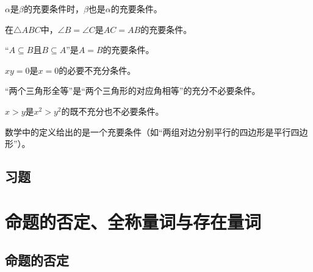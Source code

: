 \documentclass[lang=cn,math=cm,chinesefont=nofont,11pt,scheme=chinese,onecol]{elegantbook}
\begin{document}
\begin{remark}
  $\alpha$是$\beta$的充要条件时，$\beta$也是$\alpha$的充要条件。
\end{remark}

\begin{example}
  在$\triangle ABC$中，$\angle B=\angle C$是$AC=AB$的充要条件。
\end{example}

\begin{example}
  “$A\subseteq B$且$B\subseteq A”$是$A=B$的充要条件。
\end{example}

\begin{example}
  $xy=0$是$x=0$的必要不充分条件。
\end{example}

\begin{example}
  “两个三角形全等”是“两个三角形的对应角相等”的充分不必要条件。
\end{example}

\begin{example}
  $x>y$是$x^2>y^2$的既不充分也不必要条件。
\end{example}

\begin{remark}
  数学中的定义给出的是一个充要条件（如“两组对边分别平行的四边形是平行四边形”）。
\end{remark}

\subsection{习题}

\section{命题的否定、全称量词与存在量词}

\subsection{命题的否定}
\end{document}
